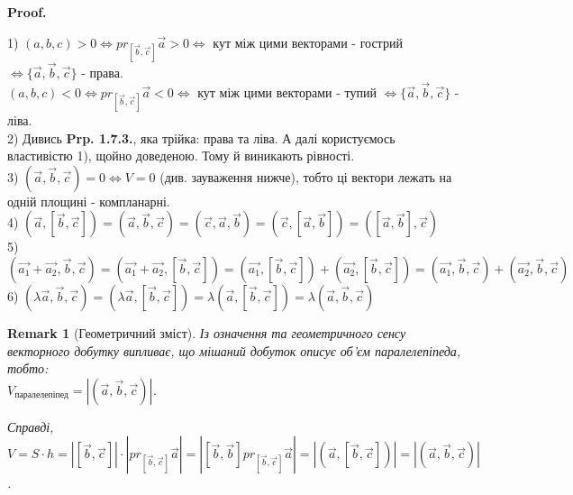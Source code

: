\documentclass[a4paper, 10pt]{extarticle}
\makeatletter
\def\qed{$\blacksquare$}
\def\qed{$\blacksquare$}
\theoremstyle{theoremdd}
\theoremstyle{theoremdd}
\theoremstyle{theoremdd}
\theoremstyle{theoremdd}
\theoremstyle{theoremdd}
\theoremstyle{theoremdd}
\newtheorem{remark}[theorem]{Remark}
\theoremstyle{theoremdd}
\theoremstyle{theoremdd}
\renewenvironment{proof}[1][Proof.\\]{\par
\pushQED{\hfill \qed}%
\normalfont \topsep6\p@\@plus6\p@\relax
\trivlist
\item\relax
{\bfseries
#1\@addpunct{.}}\hspace\labelsep\ignorespaces
}{%
\popQED\endtrivlist\@endpefalse
}
\makeatother
\begin{document}
\begin{proof}
1) $(a,b,c) > 0 \iff pr_{[\vec{b}, \vec{c}]} \vec{a} > 0 \iff$ кут між цими векторами - гострий $\iff \{\vec{a}, \vec{b}, \vec{c}\}$ - права.\\
$(a,b,c) < 0 \iff pr_{[\vec{b}, \vec{c}]} \vec{a} < 0 \iff$ кут між цими векторами - тупий $\iff \{\vec{a}, \vec{b}, \vec{c}\}$ - ліва.
\bigskip \\
2) Дивись \textbf{Prp. 1.7.3.}, яка трійка: права та ліва. А далі користуємось властивістю 1), щойно доведеною. Тому й виникають рівності.\bigskip \\
3) $(\vec{a}, \vec{b}, \vec{c}) = 0 \iff V = 0$ (див. зауваження нижче), тобто ці вектори лежать на одній площині - компланарні. \bigskip \\
4) $(\vec{a}, [\vec{b},\vec{c}]) = (\vec{a}, \vec{b}, \vec{c}) = (\vec{c}, \vec{a}, \vec{b}) = (\vec{c}, [\vec{a}, \vec{b}]) = ([\vec{a},\vec{b}], \vec{c})$ \bigskip \\
5) $(\vec{a_1}+\vec{a_2}, \vec{b}, \vec{c}) = (\vec{a_1}+\vec{a_2}, [\vec{b},\vec{c}]) = (\vec{a_1},[\vec{b},\vec{c}]) + (\vec{a_2},[\vec{b},\vec{c}]) = (\vec{a_1},\vec{b},\vec{c}) + (\vec{a_2},\vec{b},\vec{c})$\bigskip \\
6) $(\lambda \vec{a}, \vec{b}, \vec{c}) = (\lambda \vec{a}, [\vec{b}, \vec{c}]) = \lambda (\vec{a},[\vec{b},\vec{c}]) = \lambda (\vec{a},\vec{b},\vec{c})$
\end{proof}

\begin{remark}[Геометричний зміст]
Із означення та геометричного сенсу векторного добутку випливає, що мішаний добуток описує об'єм паралелепіпеда, тобто:\\
$V_{\text{паралелепіпед}} = |(\vec{a},\vec{b},\vec{c})|$.
\begin{figure}[H]
\centering
{}
\end{figure}
Справді, $V = S\cdot h = |[\vec{b}, \vec{c}]| \cdot |pr_{[\vec{b}, \vec{c}]} \vec{a}| = |[\vec{b}, \vec{b}] pr_{[\vec{b}, \vec{c}]} \vec{a}| = |(\vec{a}, [\vec{b}, \vec{c}])| = |(\vec{a},\vec{b},\vec{c})|$.
\end{remark}
\end{document}
